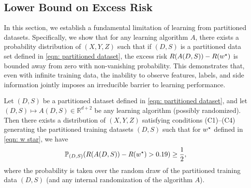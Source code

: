 \subsection{Lower Bound on Excess Risk}

In this section, we establish a fundamental limitation of learning from partitioned datasets. Specifically, we show that for any learning algorithm $A$, there exists a probability distribution of $(X, Y, Z)$ such that if $(D,S)$ is a partitioned data set  defined in \eqref{eqn: partitioned dataset}, the excess risk $R(A(D,S)) - R(w^\star)$ is bounded away from zero with non-vanishing probability. This demonstrates that, even with infinite training data, the inability to observe features, labels, and side information jointly imposes an irreducible barrier to learning performance.

\begin{thm}\label{thm: Lower bound on excess risk}
    Let $(D,S)$ be a partitioned dataset defined in \eqref{eqn: partitioned dataset}, and let $(D,S) \mapsto A(D,S) \in \mathbb{R}^{d+2}$ be any learning algorithm (possibly randomized).
    Then there exists a distribution of $(X, Y, Z)$ satisfying conditions \textnormal{(C1)--(C4)} generating the partitioned training datasets $(D,S)$ such that for $w^\star$ defined in \eqref{eqn: w star}, we have
    \begin{equation}
        \mathbb{P}_{(D,S)}(R(A(D,S)) - R(w^\star) > 0.19) \geq \frac{1}{2},
    \end{equation}
    where the probability is taken over the random draw of the partitioned training data $(D,S)$ (and any internal randomization of the algorithm $A$).
\end{thm}

